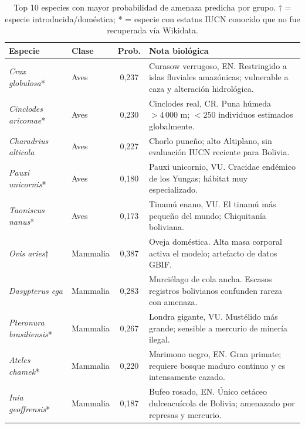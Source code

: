 \documentclass[12pt,a4paper]{article}
\begin{document}
\begin{table}[H]
  \centering\small
  \caption{Top 10 especies con mayor probabilidad de amenaza predicha por grupo.
           $\dagger$ = especie introducida/doméstica; * = especie con estatus IUCN
           conocido que no fue recuperada vía Wikidata.}
  \label{tab:top_predicciones}
  \begin{tabular}{p{4.2cm}lcp{5.5cm}}
    \toprule
    \textbf{Especie} & \textbf{Clase} & \textbf{Prob.} & \textbf{Nota biológica} \\
    \midrule
    \textit{Crax globulosa}*        & Aves     & 0,237 & Curasow verrugoso, EN. Restringido a islas fluviales amazónicas; vulnerable a caza y alteración hidrológica. \\
    \textit{Cinclodes aricomae}*    & Aves     & 0,230 & Cinclodes real, CR. Puna húmeda $>4\,000$ m; $<250$ individuos estimados globalmente. \\
    \textit{Charadrius alticola}    & Aves     & 0,227 & Chorlo puneño; alto Altiplano, sin evaluación IUCN reciente para Bolivia. \\
    \textit{Pauxi unicornis}*       & Aves     & 0,180 & Pauxi unicornio, VU. Cracidae endémico de los Yungas; hábitat muy especializado. \\
    \textit{Taoniscus nanus}*       & Aves     & 0,173 & Tinamú enano, VU. El tinamú más pequeño del mundo; Chiquitanía boliviana. \\
    \midrule
    \textit{Ovis aries}$\dagger$    & Mammalia & 0,387 & Oveja doméstica. Alta masa corporal activa el modelo; artefacto de datos GBIF. \\
    \textit{Dasypterus ega}         & Mammalia & 0,283 & Murciélago de cola ancha. Escasos registros bolivianos confunden rareza con amenaza. \\
    \textit{Pteronura brasiliensis}*& Mammalia & 0,267 & Londra gigante, VU. Mustélido más grande; sensible a mercurio de minería ilegal. \\
    \textit{Ateles chamek}*         & Mammalia & 0,220 & Marimono negro, EN. Gran primate; requiere bosque maduro continuo y es intensamente cazado. \\
    \textit{Inia geoffrensis}*      & Mammalia & 0,187 & Bufeo rosado, EN. Único cetáceo dulceacuícola de Bolivia; amenazado por represas y mercurio. \\
    \bottomrule
  \end{tabular}
\end{table}
\end{document}
